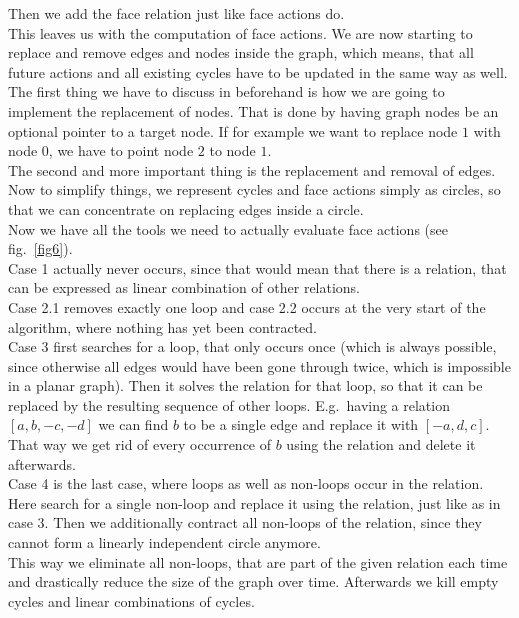 \documentclass[11pt, a4paper,draft]{report}
\begin{document}
    Then we add the face relation just like face actions do.\\
    This leaves us with the computation of face actions.
    We are now starting to replace and remove edges and nodes inside the graph, which means, that all future actions and all existing cycles have to be updated in the same way as well.
    The first thing we have to discuss in beforehand is how we are going to implement the replacement of nodes.
    That is done by having graph nodes be an optional pointer to a target node.
    If for example we want to replace node $1$ with node $0$, we have to point node $2$ to node $1$.\\
    The second and more important thing is the replacement and removal of edges.
    Now to simplify things, we represent cycles and face actions simply as circles, so that we can concentrate on replacing edges inside a circle.\\
    \newpage
    Now we have all the tools we need to actually evaluate face actions (see fig.\ \ref{fig6}).\\
    
    Case 1 actually never occurs, since that would mean that there is a relation, that can be expressed as linear combination of other relations.\\
    Case 2.1 removes exactly one loop and case 2.2 occurs at the very start of the algorithm, where nothing has yet been contracted.\\
    Case 3 first searches for a loop, that only occurs once (which is always possible, since otherwise all edges would have been gone through twice, which is impossible in a planar graph).
    Then it solves the relation for that loop, so that it can be replaced by the resulting sequence of other loops.
    E.g.\ having a relation $[a, b, -c, -d]$ we can find $b$ to be a single edge and replace it with $[-a, d, c]$.
    That way we get rid of every occurrence of $b$ using the relation and delete it afterwards.\\
    Case 4 is the last case, where loops as well as non-loops occur in the relation.
    Here search for a single non-loop and replace it using the relation, just like as in case 3.
    Then we additionally contract all non-loops of the relation, since they cannot form a linearly independent circle anymore.\\
    This way we eliminate all non-loops, that are part of the given relation each time and drastically reduce the size of the graph over time.
    Afterwards we kill empty cycles and linear combinations of cycles.
\end{document}

